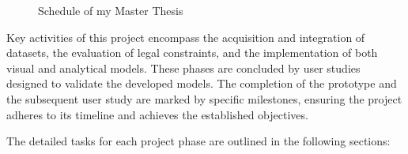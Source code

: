 \documentclass[11pt, titlepage, a4paper]{article}
\begin{document}
\begin{linenumbers}
\begin{figure}[h]
\begin{ganttchart}
        \end{ganttchart}
        \caption{Schedule of my Master Thesis}
        \label{fig:time_shedule}
    \end{figure}

    Key activities of this project encompass the acquisition and integration of datasets, the evaluation of legal constraints, and the implementation of both visual and analytical models. These phases are concluded by user studies designed to validate the developed models. The completion of the prototype and the subsequent user study are marked by specific milestones, ensuring the project adheres to its timeline and achieves the established objectives.

    The detailed tasks for each project phase are outlined in the following sections:


\end{linenumbers}
\end{document}
